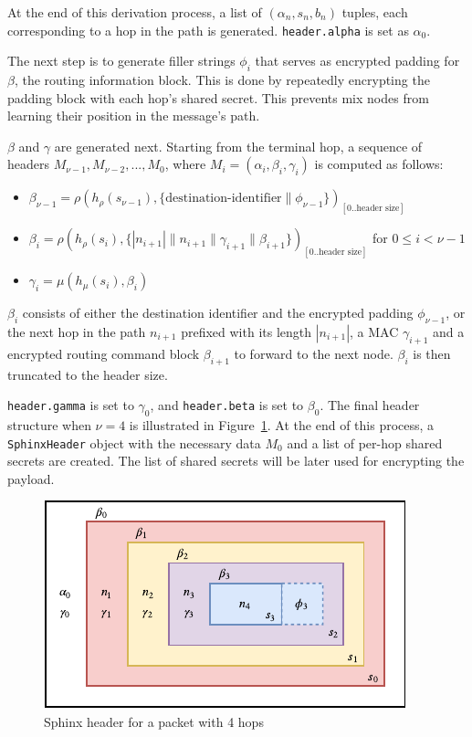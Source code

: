 \documentclass[final,dissertation.tex]{subfiles}
\begin{document}
At the end of this derivation process, a list of $(\alpha_n, s_n, b_n)$ tuples, each corresponding to a hop in the path is generated. \verb|header.alpha| is set as $\alpha_0$.

The next step is to generate filler strings $\phi_i$ that serves as encrypted padding for $\beta$, the routing information block. This is done by repeatedly encrypting the padding block with each hop's shared secret. This prevents mix nodes from learning their position in the message's path.

$\beta$ and $\gamma$ are generated next. Starting from the terminal hop, a sequence of headers $M_{\nu-1},M_{\nu-2},...,M_{0}$, where $M_i = (\alpha_i, \beta_i, \gamma_i)$ is computed as follows:

\begin{itemize}
	\setlength\itemsep{-0em}
	\item $\beta_{\nu-1} = \rho(h_\rho(s_{\nu-1}), \{{\text{destination-identifier}}\|\phi_{\nu-1}\})_{[0..\text{header size}]}$
	\item $\beta_{i} = \rho(h_\rho(s_{i}),  \{|n_{i+1}| \| n_{i+1} \| \gamma_{i+1} \| \beta_{i+1}\})_{[0..\text{header size}]}$ for $0 \le i < \nu - 1$
	\item $\gamma_i = \mu(h_\mu(s_{i}), \beta_i)$
\end{itemize}

$\beta_i$ consists of either the destination identifier and the encrypted padding $\phi_{\nu-1}$, or the next hop in the path $n_{i+1}$ prefixed with its length $|n_{i+1}|$, a MAC $\gamma_{i+1}$ and a encrypted routing command block $\beta_{i+1}$ to forward to the next node. $\beta_i$ is then truncated to the header size.

\verb|header.gamma| is set to $\gamma_0$, and \verb|header.beta| is set to $\beta_0$. The final header structure when $\nu = 4$ is illustrated in Figure~\ref{fig:sphinx_header}. At the end of this process, a \verb|SphinxHeader| object with the necessary data $M_0$ and a list of per-hop shared secrets are created. The list of shared secrets will be later used for encrypting the payload.


\begin{figure}[h]
	\includegraphics[width=\linewidth]{../figs/sphinx_header}
	\caption{Sphinx header for a packet with 4 hops}\label{fig:sphinx_header}
\end{figure}
\end{document}
